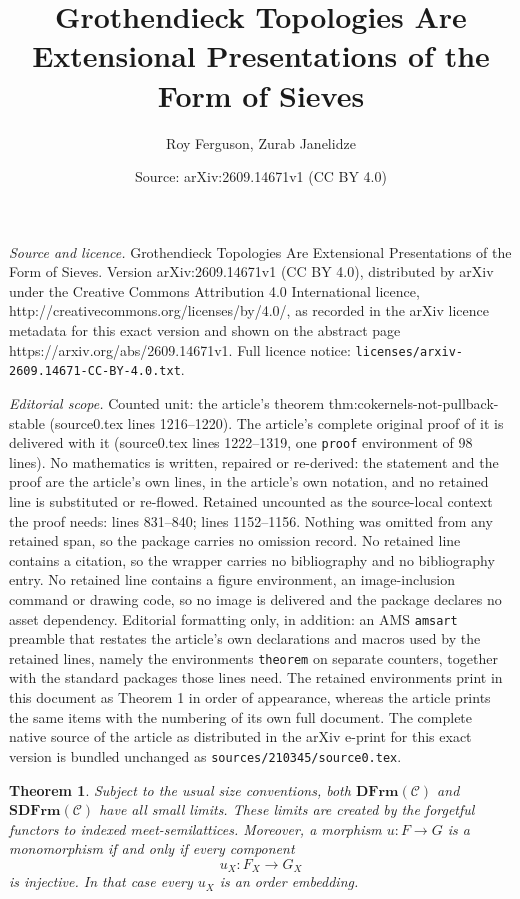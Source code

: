 \documentclass[10pt,a4paper]{amsart}
\title{Grothendieck Topologies Are Extensional Presentations of the Form of Sieves}
\author{Roy Ferguson, Zurab Janelidze}
\date{Source: arXiv:2609.14671v1 (CC BY 4.0)}
\newtheorem{theorem}{Theorem}
\newcommand{\C}{\mathcal C}
\newcommand{\DFrm}{\mathbf{DFrm}}
\newcommand{\SDFrm}{\mathbf{SDFrm}}
\begin{document}
\maketitle

\noindent\emph{Source and licence.} Grothendieck Topologies Are Extensional Presentations of the Form of Sieves. Version arXiv:2609.14671v1 (CC BY 4.0), distributed by arXiv under the Creative Commons Attribution 4.0 International licence, http://creativecommons.org/licenses/by/4.0/, as recorded in the arXiv licence metadata for this exact version and shown on the abstract page https://arxiv.org/abs/2609.14671v1. Full licence notice: \texttt{licenses/arxiv-2609.14671-CC-BY-4.0.txt}.\par\smallskip

\noindent\textit{Editorial scope.} Counted unit: the article's theorem thm:cokernels-not-pullback-stable (source0.tex lines 1216--1220). The article's complete original proof of it is delivered with it (source0.tex lines 1222--1319, one \texttt{proof} environment of 98 lines). No mathematics is written, repaired or re-derived: the statement and the proof are the article's own lines, in the article's own notation, and no retained line is substituted or re-flowed.  Retained uncounted as the source-local context the proof needs: lines 831--840; lines 1152--1156.  Nothing was omitted from any retained span, so the package carries no omission record.  No retained line contains a citation, so the wrapper carries no bibliography and no bibliography entry.  No retained line contains a figure environment, an image-inclusion command or drawing code, so no image is delivered and the package declares no asset dependency.  Editorial formatting only, in addition: an AMS \texttt{amsart} preamble that restates the article's own declarations and macros used by the retained lines, namely the environments \texttt{theorem} on separate counters, together with the standard packages those lines need.  The retained environments print in this document as Theorem 1 in order of appearance, whereas the article prints the same items with the numbering of its own full document.  The complete native source of the article as distributed in the arXiv e-print for this exact version is bundled unchanged as \texttt{sources/210345/source0.tex}.
\begin{theorem}\label{thm:limits-and-monomorphisms}
Subject to the usual size conventions, both \(\DFrm(\C)\) and
\(\SDFrm(\C)\) have all small limits.  These limits are created by the
forgetful functors to indexed meet-semilattices.  Moreover, a morphism
\(u:F\to G\) is a monomorphism if and only if every component
\[
                       u_X:F_X\longrightarrow G_X
\]
is injective.  In that case every \(u_X\) is an order embedding.
\end{theorem}
\end{document}
